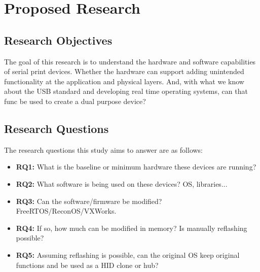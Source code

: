 \chapter{\leavevmode Proposed Research}
\label{chap:proposedresearch}



\section{Research Objectives }

The goal of this research is to understand the hardware and software capabilities of serial print devices. Whether the hardware can support adding unintended functionality at the application and physical layers. And, with what we know about the USB standard and developing real time operating systems, can that func be used to create a dual purpose device?


\section{Research Questions}

The research questions this study aims to answer are as follows:

\begin{itemize}
  \item \textbf{RQ1:} What is the baseline or minimum hardware these devices are running?
  \item \textbf{RQ2:} What software is being used on these devices? OS, libraries...
  \item \textbf{RQ3:} Can the software/firmware be modified? FreeRTOS/ReconOS/VXWorks.
  \item \textbf{RQ4:} If so, how much can be modified in memory? Is manually reflashing possible?
  \item \textbf{RQ5:} Assuming reflashing is possible, can the original OS keep original functions and be used as a HID clone or hub?
\end{itemize}


